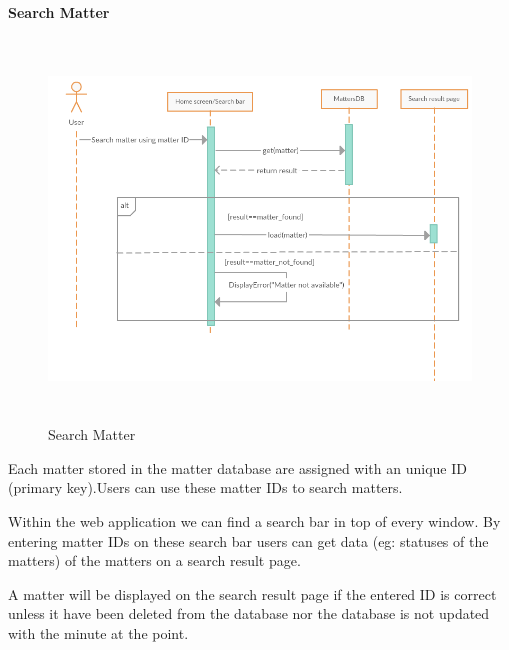 \documentclass[a4paper,beamer]{article}
\begin{document}
		\textbf{Search Matter}\newline
		\begin{figure}[h!]
			\begin{center}
			\includegraphics[width=6in,height=4in]{img/seq-search-matter}
			\end{center}
			\caption{Search Matter}
			\label{fig:search-matter}
		\end{figure}
		        
		Each matter stored in the matter database are assigned with an unique ID (primary key).Users can use these matter IDs to search matters.\newline
		
		Within the web application we can find a search bar in top of every window. By entering matter IDs on these search bar users can get data (eg: statuses of the matters) of the matters on a search result page. \newline
		
		A matter will be displayed on the search result page if the entered ID is correct  unless it have been deleted from the database nor the database is not updated with the minute at the point.\newline
		\newpage
		
\end{document}
